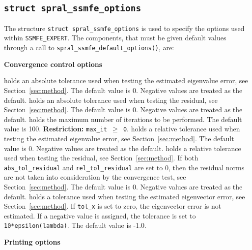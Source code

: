 \subsection{\texttt{struct spral\_ssmfe\_options}} \label{sec:options}

The structure {\tt struct spral\_ssmfe\_options} is used to specify
the options used within {\tt SSMFE\_EXPERT}. The components, that must be given
default values through a call to \texttt{spral\_ssmfe\_default\_options()}, are:

\bigskip
\noindent
{\bf Convergence control options}

\begin{description}
%
holds an absolute tolerance used when testing the estimated eigenvalue 
error, see Section~\ref{sec:method}. 
The default value is 0. %
Negative values are treated as the default.
%
holds an absolute tolerance used when testing the residual, 
see Section~\ref{sec:method}.
The default value is 0.
Negative values are treated as the default.
%
holds the maximum number of iterations to be performed.
The default value is 100.
{\bf Restriction:} {\tt max\_it $\ge$ 0}.
%
holds a relative tolerance used when testing the estimated eigenvalue 
error, see Section~\ref{sec:method}. 
The default value is 0.
Negative values are treated as the default.
%
holds a relative tolerance used when testing the residual,
see Section~\ref{sec:method}. 
If both {\tt abs\_tol\_residual} and {\tt rel\_tol\_residual}
are set to 0, then the residual norms are not taken
into consideration by the convergence test,
see Section~\ref{sec:method}.
The default value is 0.
Negative values are treated as the default.
%
holds a tolerance used when testing the estimated 
eigenvector error, see Section~\ref{sec:method}. 
If {\tt tol\_x} is set to zero, the eigenvector error is not estimated.
If a negative value is assigned, the tolerance is set to
{\tt 10*epsilon(lambda)}.
The default value is -1.0.
%
\end{description}

\medskip
\noindent
{\bf Printing options}


